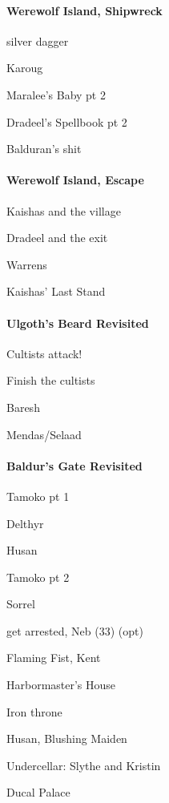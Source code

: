 \documentclass[10pt,a4,twoside]{book}
\begin{document}
\begin{multicols}{3}
\paragraph*{Werewolf Island, Shipwreck}
\begin{trivlist}
\item silver dagger
\item Karoug
\item Maralee's Baby pt 2  \label{peldan} %
\item Dradeel's Spellbook pt 2  \label{spellbook} %
\item Balduran's shit
\end{trivlist}

\paragraph*{Werewolf Island, Escape}
\begin{trivlist}
\item Kaishas and the village
\item Dradeel and the exit
\item Warrens
\item Kaishas' Last Stand
\end{trivlist}

\paragraph*{Ulgoth's Beard Revisited}
\begin{trivlist}
\item Cultists attack!
\item Finish the cultists
\item Baresh
\item Mendas/Selaad
\end{trivlist}

\paragraph*{Baldur's Gate Revisited}
\begin{trivlist}
\item Tamoko pt 1
\item Delthyr
\item Husan
\item Tamoko pt 2
\item Sorrel
\item get arrested, Neb (33) (opt)
\item Flaming Fist, Kent
\item Harbormaster's House
\item Iron throne %
\item Husan, Blushing Maiden
\item Undercellar: Slythe and Kristin
\item Ducal Palace
\end{trivlist}


\end{multicols}
\end{document}
